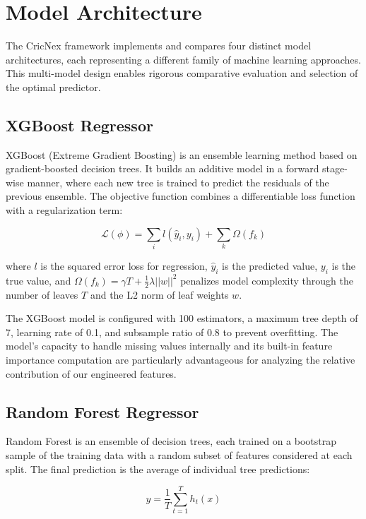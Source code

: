\documentclass[conference]{IEEEtran}
\begin{document}
\section{Model Architecture}
The CricNex framework implements and compares four distinct model architectures, each representing a different family of machine learning approaches. This multi-model design enables rigorous comparative evaluation and selection of the optimal predictor.

\subsection{XGBoost Regressor}
XGBoost (Extreme Gradient Boosting) is an ensemble learning method based on gradient-boosted decision trees. It builds an additive model in a forward stage-wise manner, where each new tree is trained to predict the residuals of the previous ensemble. The objective function combines a differentiable loss function with a regularization term:

\begin{equation}
\mathcal{L}(\phi) = \sum_{i} l(\hat{y}_i, y_i) + \sum_{k} \Omega(f_k)
\label{eq:xgb_obj}
\end{equation}

where \(l\) is the squared error loss for regression, \(\hat{y}_i\) is the predicted value, \(y_i\) is the true value, and \(\Omega(f_k) = \gamma T + \frac{1}{2}\lambda||w||^2\) penalizes model complexity through the number of leaves \(T\) and the L2 norm of leaf weights \(w\).

The XGBoost model is configured with 100 estimators, a maximum tree depth of 7, learning rate of 0.1, and subsample ratio of 0.8 to prevent overfitting. The model's capacity to handle missing values internally and its built-in feature importance computation are particularly advantageous for analyzing the relative contribution of our engineered features.

\subsection{Random Forest Regressor}
Random Forest is an ensemble of decision trees, each trained on a bootstrap sample of the training data with a random subset of features considered at each split. The final prediction is the average of individual tree predictions:

\begin{equation}
\hat{y} = \frac{1}{T} \sum_{t=1}^{T} h_t(x)
\label{eq:rf}
\end{equation}
\end{document}

